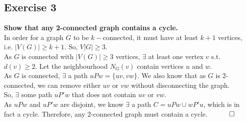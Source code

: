 \subsection*{Exercise 3}
\textbf{Show that any 2-connected graph contains a cycle.} \\
\linebreak
In order for a graph $G$ to be $k-$connected, it must have at least $k+1$ vertices, i.e. $|V(G)| \geq k+1$. So, $V|G| \geq 3$. \\
\linebreak
As $G$ is connected with $|V(G)| \geq 3$ vertices, $\exists$ at least one vertex $v$ s.t. $d(v) \geq 2$. Let the neighbourhood $N_G(v)$ contain vertices $u$ and $w$. \\
\linebreak 
As $G$ is connected, $\exists$ a path $uPw = \{uv, vw\}$. We also know that as $G$ is 2-connected, we can remove either $uv$ or $vw$ without disconnecting the graph. \\
\linebreak 
So, $\exists$ some path $uP'w$ that does not contain $uv$ or $vw$. \\
\linebreak 
As $uPw$ and $uP'w$ are disjoint, we know $\exists$ a path $C = uPw \cup wP'u$, which is in fact a cycle. Therefore, any 2-connected graph must contain a cycle. 
$\hspace{10mm} \square$